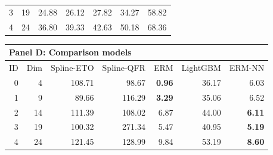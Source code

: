 \begin{table}[htbp]
\begin{tabular}{rrrrrrr}
3 & 19 & 24.88 & 26.12 & 27.82 & 34.27 & 58.82 \\
4 & 24 & 36.80 & 39.33 & 42.63 & 50.18 & 68.36 \\
\bottomrule
\end{tabular}
\par\medskip
\begin{tabular}{rrrrrrr}
\toprule
\multicolumn{7}{l}{\textbf{Panel D: Comparison models}} \\
\midrule
ID & Dim & Spline-ETO & Spline-QFR & ERM & LightGBM & ERM-NN \\
\midrule
0 & 4 & 108.71 & 98.67 & \textbf{0.96} & 36.17 & 6.03 \\
1 & 9 & 89.66 & 116.29 & \textbf{3.29} & 35.06 & 6.52 \\
2 & 14 & 111.39 & 108.02 & 6.87 & 44.00 & \textbf{6.11} \\
3 & 19 & 100.32 & 271.34 & 5.47 & 40.95 & \textbf{5.19} \\
4 & 24 & 121.45 & 128.99 & 9.84 & 53.19 & \textbf{8.60} \\
\bottomrule
\end{tabular}
\end{table}
